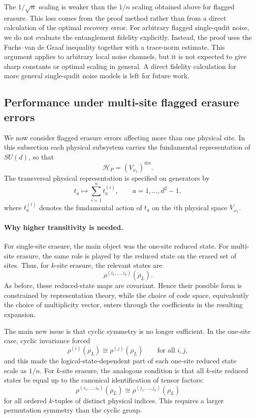 \documentclass[10pt,twocolumn,superscriptaddress,aps,amsmath,amssymb,citeautoscript,floatfix,prx,longbibliography]{revtex4-2}
\theoremstyle{plain}
\theoremstyle{plain}
\theoremstyle{plain}
\theoremstyle{plain}
\theoremstyle{plain}
\theoremstyle{plain}
\begin{document}
The $1/\sqrt n$ scaling is weaker than the $1/n$ scaling obtained above for flagged erasure. This loss comes from the proof method rather than from a direct calculation of the optimal recovery error. For arbitrary flagged single-qudit noise, we do not evaluate the entanglement fidelity explicitly. Instead, the proof uses the Fuchs--van de Graaf inequality together with a trace-norm estimate. This argument applies to arbitrary local noise channels, but it is not expected to give sharp constants or optimal scaling in general. A direct fidelity calculation for more general single-qudit noise models is left for future work.

\subsection{Performance under multi-site flagged erasure errors}\label{subsec:main_muti_erasure_noise}

We now consider flagged erasure errors affecting more than one physical site. In this subsection each physical subsystem carries the fundamental representation of $SU(d)$, so that
$$
\mathcal H_P=(V_{\omega_1})^{\otimes n}.
$$
The transversal physical representation is specified on generators by
$$
t_a
\longmapsto
\sum_{i=1}^n t_a^{(i)},
\qquad
a=1,\ldots,d^2-1,
$$
where $t_a^{(i)}$ denotes the fundamental action of $t_a$ on the $i$th physical space $V_{\omega_1}$.

\paragraph{Why higher transitivity is needed.}

For single-site erasure, the main object was the one-site reduced state. For multi-site erasure, the same role is played by the reduced state on the erased set of sites. Thus, for $k$-site erasure, the relevant states are
$$
\rho^{(i_1,\ldots,i_k)}(\rho_L).
$$
As before, these reduced-state maps are covariant. Hence their possible form is constrained by representation theory, while the choice of code space, equivalently the choice of multiplicity vector, enters through the coefficients in the resulting expansion.

The main new issue is that cyclic symmetry is no longer sufficient. In the one-site case, cyclic invariance forced
$$
\rho^{(i)}(\rho_L)
\cong
\rho^{(j)}(\rho_L)
\qquad
\text{for all } i,j,
$$
and this made the logical-state-dependent part of each one-site reduced state scale as $1/n$. For $k$-site erasure, the analogous condition is that all $k$-site reduced states be equal up to the canonical identification of tensor factors:
$$
\rho^{(i_1,\ldots,i_k)}(\rho_L)
\cong
\rho^{(j_1,\ldots,j_k)}(\rho_L)
$$
for all ordered $k$-tuples of distinct physical indices. This requires a larger permutation symmetry than the cyclic group.
\end{document}

